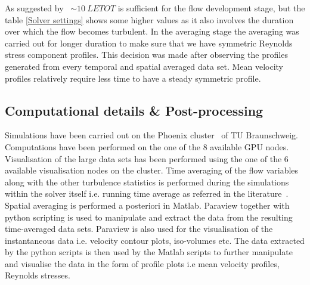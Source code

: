 %
As suggested by~\cite{mk} $\sim10\ LETOT$ is sufficient for the flow development stage, but the table \ref{Solver settings} shows some higher values as it also involves the duration over which the flow becomes turbulent.
In the averaging stage the averaging was carried out for longer duration to make sure that we have symmetric Reynolds stress component profiles. This decision was made after observing the profiles generated from every temporal and spatial averaged data set. Mean velocity profiles relatively require less time to have a steady symmetric profile.

\subsection{Computational details \& Post-processing}
Simulations have been carried out on the Phoenix cluster~\cite{phoenix} of TU Braunschweig. Computations have been performed on the one of the 8 available GPU nodes. Visualisation of the large data sets has been performed using the one of the 6 available visualisation nodes on the cluster.
Time averaging of the flow variables along with the other turbulence statistics is performed during the simulations within the solver itself i.e. running time average as referred in the literature~\cite{Moin:78}. Spatial averaging is performed a posteriori in Matlab. Paraview together with python scripting is used to manipulate and extract the data from the resulting time-averaged data sets. Paraview is also used for the visualisation of the instantaneous data i.e. velocity contour plots, iso-volumes etc. The data extracted by the python scripts is then used by the Matlab scripts to further manipulate and visualise the data in the form of profile plots i.e mean velocity profiles, Reynolds stresses.



 
